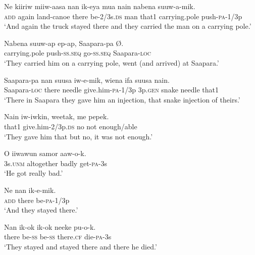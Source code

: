 {\ea\label{ex:a:x32}
\gll  Ne  kiiriw  miiw-aasa  nan  ik-eya  mua  nain  nabena          suuw-a-mik. \\
\textsc{add}  again  land-canoe  there  be-2/3s.\textsc{ds}  man  that1  carrying.pole push-\textsc{pa}-1/3p \\


\glt ‘And again the truck stayed there and they carried the man on a carrying pole.’ \\
\z


\ea\label{ex:a:x33}
\gll  Nabena  suuw-ap  ep-ap,  Saapara-pa  Ø. \\
carrying.pole  push-\textsc{ss.seq}  go-\textsc{ss.seq}  Saapara-\textsc{loc} \\
\glt ‘They carried him on a carrying pole, went (and arrived) at Saapara.’ \\
\z


\ea\label{ex:a:x34}
\gll  Saapara-pa  nan  suusa  iw-e-mik,  wiena  ifa  suusa  nain. \\
Saapara-\textsc{loc}  there  needle  give.him-\textsc{pa}-1/3p  3p.\textsc{gen}  snake  needle  that1 \\
\glt ‘There in Saapara they gave him an injection, that snake injection of theirs.’ \\
\z


\ea\label{ex:a:x35}
\gll  Nain  iw-iwkin,  weetak,  me  pepek. \\
that1  give.him-2/3p.\textsc{ds}  no  not  enough/able \\
\glt ‘They gave him that but no, it was not enough.’ \\
\z


\ea\label{ex:a:x36}
\gll  O  iiwawun  samor  aaw-o-k. \\
3s.\textsc{unm}  altogether  badly  get-\textsc{pa}-3s \\
\glt ‘He got really bad.’ \\
\z


\ea\label{ex:a:x37}
\gll  Ne  nan  ik-e-mik. \\
\textsc{add}  there  be-\textsc{pa}-1/3p \\
\glt ‘And they stayed there.’ \\
\z


\ea\label{ex:a:x38}
\gll  Nan  ik-ok  ik-ok  neeke  pu-o-k. \\
there  be-\textsc{ss}  be-\textsc{ss}  there.\textsc{cf}  die-\textsc{pa}-3s \\
\glt ‘They stayed and stayed there and there he died.’ \\
\z


}

